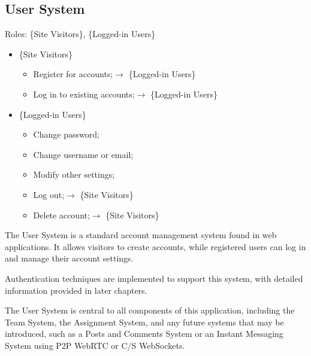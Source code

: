 \documentclass[12pt]{report}
\newcommand{\n}{\par}
\newcommand{\br}{\vspace{1 em}\n}
\begin{document}
\subsection{User System} \label{overview.project-objectives.user-system}
Roles: \{Site Visitors\}, \{Logged-in Users\}\n
\begin{itemize}
	\item \{Site Visitors\}
	      \begin{itemize}
		      \item Register for accounts;\null\hfill $\rightarrow$ \{Logged-in Users\}
		      \item Log in to existing accounts;\null\hfill $\rightarrow$ \{Logged-in Users\}
	      \end{itemize}
	\item \{Logged-in Users\}
	      \begin{itemize}
		      \item Change password;
		      \item Change username or email;
		      \item Modify other settings;
		      \item Log out;\null\hfill $\rightarrow$ \{Site Visitors\}
		      \item Delete account;\null\hfill $\rightarrow$ \{Site Visitors\}
	      \end{itemize}
\end{itemize}\n
The User System is a standard account management system found in web applications.
It allows visitors to create accounts, while registered users can log in and manage their account settings.
\br
Authentication techniques are implemented to support this system, with detailed information provided in later chapters.
\br
The User System is central to all components of this application,
including the Team System, the Assignment System, and any future systems that may be introduced,
such as a Posts and Comments System or an Instant Messaging System using P2P WebRTC or C/S WebSockets.
\end{document}

